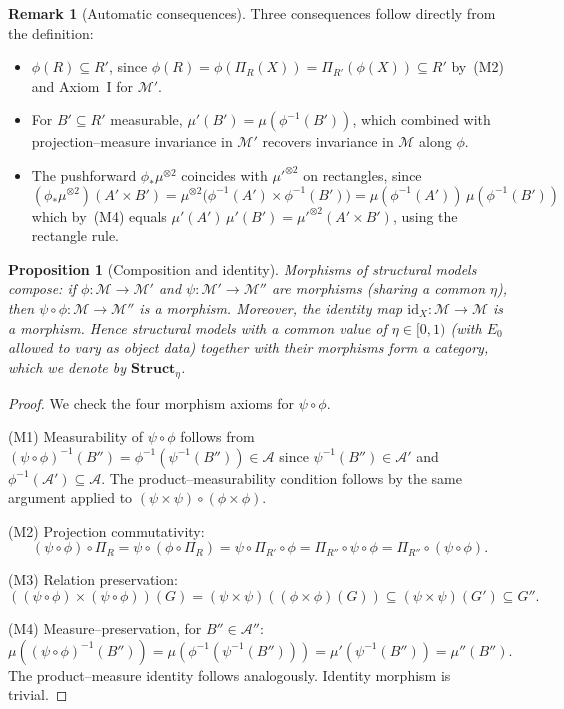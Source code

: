 \documentclass[11pt]{article}
\numberwithin{equation}{section}
\newtheorem{proposition}[theorem]{Proposition}
\theoremstyle{definition}
\newtheorem{remark}[theorem]{Remark}
\begin{document}
\begin{remark}[Automatic consequences]\label{rem:morphism-consequences}
Three consequences follow directly from the definition:
\begin{itemize}[nosep]
\item $\phi(R)\subseteq R'$, since $\phi(R)=\phi(\Pi_R(X))=\Pi_{R'}(\phi(X))\subseteq R'$ by~(M2) and Axiom~I for $\mathcal M'$.
\item For $B'\subseteq R'$ measurable, $\mu'(B')=\mu(\phi^{-1}(B'))$, which combined with projection--measure invariance in $\mathcal M'$ recovers invariance in $\mathcal M$ along $\phi$.
\item The pushforward $\phi_*\mu^{\otimes2}$ coincides with $\mu'^{\otimes2}$ on rectangles, since
\[
(\phi_*\mu^{\otimes2})(A'\times B')=\mu^{\otimes2}\bigl(\phi^{-1}(A')\times\phi^{-1}(B')\bigr)=\mu(\phi^{-1}(A'))\,\mu(\phi^{-1}(B'))
\]
which by~(M4) equals $\mu'(A')\,\mu'(B')=\mu'^{\otimes2}(A'\times B')$, using the rectangle rule.
\end{itemize}
\end{remark}

\begin{proposition}[Composition and identity]\label{prop:category}
Morphisms of structural models compose: if $\phi:\mathcal M\to\mathcal M'$ and $\psi:\mathcal M'\to\mathcal M''$ are morphisms (sharing a common $\eta$), then $\psi\circ\phi:\mathcal M\to\mathcal M''$ is a morphism. Moreover, the identity map $\mathrm{id}_X:\mathcal M\to\mathcal M$ is a morphism. Hence structural models with a common value of $\eta\in[0,1)$ (with $E_0$ allowed to vary as object data) together with their morphisms form a category, which we denote by $\mathbf{Struct}_{\eta}$.
\end{proposition}

\begin{proof}
We check the four morphism axioms for $\psi\circ\phi$.

(M1) Measurability of $\psi\circ\phi$ follows from $(\psi\circ\phi)^{-1}(B'')=\phi^{-1}(\psi^{-1}(B''))\in\mathcal A$ since $\psi^{-1}(B'')\in\mathcal A'$ and $\phi^{-1}(\mathcal A')\subseteq\mathcal A$. The product--measurability condition follows by the same argument applied to $(\psi\times\psi)\circ(\phi\times\phi)$.

(M2) Projection commutativity:
\[
(\psi\circ\phi)\circ\Pi_R=\psi\circ(\phi\circ\Pi_R)=\psi\circ\Pi_{R'}\circ\phi=\Pi_{R''}\circ\psi\circ\phi=\Pi_{R''}\circ(\psi\circ\phi).
\]

(M3) Relation preservation:
\[
((\psi\circ\phi)\times(\psi\circ\phi))(G)=(\psi\times\psi)((\phi\times\phi)(G))\subseteq(\psi\times\psi)(G')\subseteq G''.
\]

(M4) Measure--preservation, for $B''\in\mathcal A''$:
\[
\mu((\psi\circ\phi)^{-1}(B''))=\mu(\phi^{-1}(\psi^{-1}(B'')))=\mu'(\psi^{-1}(B''))=\mu''(B'').
\]
The product--measure identity follows analogously. Identity morphism is trivial.
\end{proof}
\end{document}
